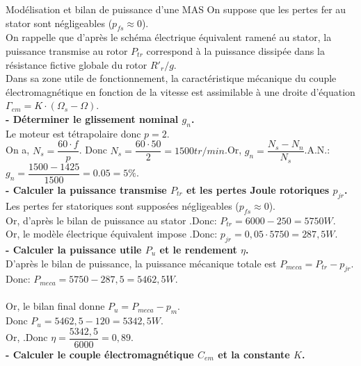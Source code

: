 \documentclass{article} %
\begin{document}
{\begin{exemple}{Modélisation et bilan de puissance d'une MAS}
On suppose que les pertes fer au stator sont négligeables ($p_{fs} \approx 0$).\\[0.3cm]
On rappelle que d'après le schéma électrique équivalent ramené au stator, la puissance transmise au rotor $P_{tr}$ correspond à la puissance dissipée dans la résistance fictive globale du rotor $R'_r/g$.\\
Dans sa zone utile de fonctionnement, la caractéristique mécanique du couple électromagnétique en fonction de la vitesse est assimilable à une droite d'équation $\Gamma_{em} = K \cdot (\Omega_s - \Omega)$.\vspace*{7pt}\\
\textbf{- Déterminer le glissement nominal $g_n$.}\\
Le moteur est tétrapolaire donc $p=2$. \\
On a, $N_s = \dfrac{60 \cdot f}{p}$. Donc $N_s = \dfrac{60 \cdot 50}{2} = 1500 tr/min$.\quad Or, $g_n = \dfrac{N_s - N_n}{N_s}$.\qquad A.N.: $g_n = \dfrac{1500 - 1425}{1500} =0.05=5\%$.\vspace*{7pt}\\
\textbf{- Calculer la puissance transmise $P_{tr}$ et les pertes Joule rotoriques $p_{jr}$.}\\
Les pertes fer statoriques sont supposées négligeables ($p_{fs} \approx 0$).\\
Or, d'après le bilan de puissance au stator .\qquad Donc: $P_{tr} = 6000 - 250=5750W$.\\
Or, le modèle électrique équivalent impose .\qquad Donc: $p_{jr} = 0{,}05 \cdot 5750=287,5W$.\vspace*{7pt}\\
\textbf{- Calculer la puissance utile $P_u$ et le rendement $\eta$.}\\
D'après le bilan de puissance, la puissance mécanique totale est $P_{meca} = P_{tr} - p_{jr}$. Donc: $P_{meca} = 5750 - 287,5 = 5462,5W$.\\
\\
Or, le bilan final donne $P_u = P_{meca} - p_m$.\\
Donc $P_u = 5462,5 - 120=5342,5W$.\\
Or, .\qquad Donc $\eta = \dfrac{5342{,}5}{6000}=0,89$.\vspace*{7pt}\\
\textbf{- Calculer le couple électromagnétique $C_{em}$ et la constante $K$.}\\

\end{exemple}}
\end{document}
